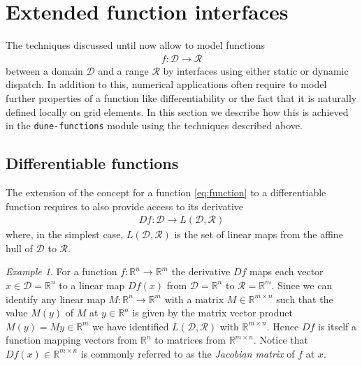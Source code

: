 \documentclass[11pt,
                 numbers=noenddot,
                 headings=normal,
                 DIV16, BCOR10mm]{scrartcl}
\theoremstyle{remark}
\newtheorem{example}{Example}
\newcommand{\dunemodule}[1]{\texttt{#1}}
\begin{document}
\section{Extended function interfaces}
\label{sec:extended_interfaces}
The techniques discussed until now allow to model functions
\begin{align}\label{eq:function}
    f:\mathcal{D} \to \mathcal{R}
\end{align}
between a domain $\mathcal{D}$ and a range $\mathcal{R}$
by interfaces using either static or dynamic dispatch.
In addition to this, numerical applications often require to model
further properties of a function like differentiability or the fact that
it is naturally defined locally on grid elements. In this section
we describe how this is achieved in the \dunemodule{dune-functions} module
using the techniques described above.

\subsection{Differentiable functions}
\label{sec:differentiable_functions}

The extension of the concept for a function \eqref{eq:function} to a differentiable
function requires to also provide access to its derivative
\begin{align}
    Df : \mathcal{D} \to L(\mathcal{D}, \mathcal{R})
\end{align}
where, in the simplest case, $L(\mathcal{D}, \mathcal{R})$ is the set of linear maps from the affine hull of $\mathcal{D}$ to $\mathcal{R}$.

\begin{example}
    For a function
    $f: \mathbb{R}^n \to \mathbb{R}^m$
    the derivative $Df$ maps each vector $x \in \mathcal{D} = \mathbb{R}^n$
    to a linear map $Df(x)$ from $\mathcal{D} = \mathbb{R}^n$ to $\mathcal{R} = \mathbb{R}^m$.
    Since we can identify any linear map $M : \mathbb{R}^n \to \mathbb{R}^m$
    with a matrix $M \in \mathbb{R}^{m \times n}$
    such that the value $M(y)$ of $M$ at $y \in \mathbb{R}^n$
    is given by the matrix vector product $M(y) = My \in \mathbb{R}^m$
    we have identified $L(\mathcal{D}, \mathcal{R})$ with $\mathbb{R}^{m \times n}$.
    Hence $Df$ is itself a function mapping vectors from $\mathbb{R}^n$ to matrices
    from $\mathbb{R}^{m \times n}$. Notice that $Df(x) \in \mathbb{R}^{m \times n}$
    is commonly referred to as the \emph{Jacobian matrix} of $f$ at $x$.
\end{example}
\end{document}
